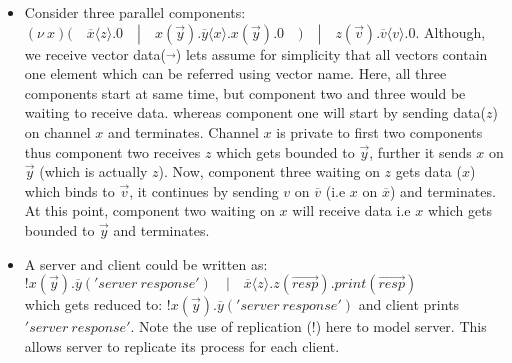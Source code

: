 \documentclass[11pt, pdftex]{article}
\begin{document}
\begin{itemize}
\item Consider three parallel components: $(\nu\ x) (\quad \overline{x}\langle z \rangle.0 \quad | \quad x(\overrightarrow{y}).\overline{y}\langle x \rangle.x(\overrightarrow{y}).0\quad) \quad | \quad z(\overrightarrow{v}).\overline{v}\langle v \rangle.0 $. Although, we receive vector data($\overrightarrow{}$) lets assume for simplicity that all vectors contain one element which can be referred using vector name. Here, all three components start at same time, but component two and three would be waiting to receive data. whereas component one will start by sending data($z$) on channel $x$ and terminates. Channel $x$ is private to first two components thus component two receives $z$ which gets bounded to $\overrightarrow{y}$, further it sends $x$ on $\overrightarrow{y}$ (which is actually $z$). Now, component three waiting on $z$ gets data ($x$) which binds to $\overrightarrow{v}$, it continues by sending $v$ on $\overline{v}$ (i.e $x$ on $\overline{x}$) and terminates. At this point, component two waiting on $x$ will receive data i.e $x$ which gets bounded to $\overrightarrow{y}$ and terminates.
\item A server and client could be written as: $!x(\overrightarrow{y}).\overline{y}('server\ response') \quad | \quad \overline{x}\langle {z} \rangle.z(\overrightarrow{resp}).print(\overrightarrow{resp})$ \\
which gets reduced to: $!x(\overrightarrow{y}).\overline{y}('server\ response')$ and client prints $'server\ response'$.
Note the use of replication (!) here to model server. This allows server to replicate its process for each client.
\end{itemize}
\end{document}
